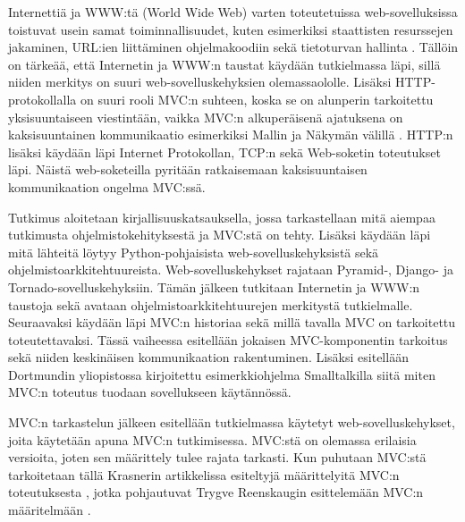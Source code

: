\documentclass[utf8]{gradu3}
\begin{document}
Internettiä ja WWW:tä (World Wide Web) varten toteutetuissa web-sovelluksissa toistuvat usein samat toiminnallisuudet, kuten esimerkiksi staattisten resurssejen jakaminen, URL:ien liittäminen ohjelmakoodiin sekä tietoturvan hallinta \parencite{pyramid_intr}. Tällöin on tärkeää, että Internetin ja WWW:n  taustat käydään tutkielmassa läpi, sillä niiden merkitys on suuri web-sovelluskehyksien olemassaololle. Lisäksi HTTP-protokollalla on suuri rooli MVC:n suhteen, koska se on alunperin tarkoitettu yksisuuntaiseen viestintään, vaikka MVC:n alkuperäisenä ajatuksena on kaksisuuntainen kommunikaatio esimerkiksi Mallin ja Näkymän välillä \parencite{reenskaug_tools}. HTTP:n lisäksi käydään läpi Internet Protokollan, TCP:n sekä Web-soketin toteutukset läpi. Näistä web-soketeilla pyritään ratkaisemaan kaksisuuntaisen kommunikaation ongelma MVC:ssä.

Tutkimus aloitetaan kirjallisuuskatsauksella, jossa tarkastellaan mitä aiempaa 
tutkimusta ohjelmistokehityksestä ja MVC:stä on tehty. Lisäksi käydään
läpi mitä lähteitä löytyy Python-pohjaisista web-sovelluskehyksistä sekä ohjelmistoarkkitehtuureista. Web-sovelluskehykset rajataan 
Pyramid-, Django- ja Tornado-sovelluskehyksiin. Tämän jälkeen tutkitaan Internetin ja WWW:n taustoja sekä avataan ohjelmistoarkkitehtuurejen merkitystä tutkielmalle. Seuraavaksi käydään läpi MVC:n historiaa sekä millä tavalla MVC on tarkoitettu toteutettavaksi. Tässä vaiheessa esitellään jokaisen MVC-komponentin tarkoitus sekä niiden 
keskinäisen kommunikaation rakentuminen. Lisäksi esitellään
Dortmundin yliopistossa kirjoitettu esimerkkiohjelma Smalltalkilla siitä miten MVC:n 
toteutus tuodaan sovellukseen käytännössä.

MVC:n tarkastelun jälkeen esitellään tutkielmassa käytetyt web-sovelluskehykset, 
joita käytetään apuna MVC:n tutkimisessa. MVC:stä on olemassa erilaisia versioita, joten sen määrittely tulee rajata tarkasti.
Kun puhutaan MVC:stä tarkoitetaan tällä Krasnerin artikkelissa esiteltyjä määrittelyitä MVC:n toteutuksesta \parencite{krasner}, jotka pohjautuvat Trygve Reenskaugin esittelemään 
MVC:n määritelmään \parencite{xerox-original}. 
\end{document}

